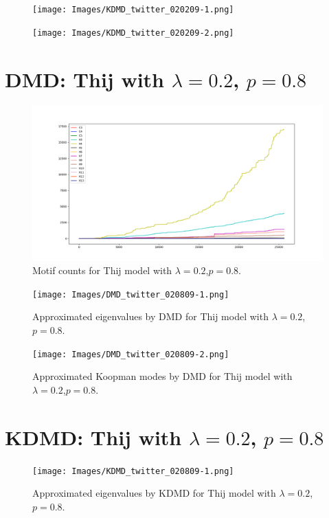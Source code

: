 \FloatBarrier


\begin{figure}
    \texttt{[image: Images/KDMD\_twitter\_020209-1.png]}
    \centering
\end{figure}

\begin{figure}
    \texttt{[image: Images/KDMD\_twitter\_020209-2.png]}
    \centering
\end{figure}

\FloatBarrier
\section{DMD: Thij with $\lambda=0.2$, $p=0.8$}
\begin{figure}
    \includegraphics[width=12cm]{Images/twitter_counts_020809.png}
    \centering
    \caption{Motif counts for Thij model with $\lambda=0.2$,$p=0.8$.}
\end{figure}

\begin{figure}
    \texttt{[image: Images/DMD\_twitter\_020809-1.png]}
    \centering
    \caption{Approximated eigenvalues by DMD for Thij model
    with $\lambda=0.2$,$p=0.8$.}
\end{figure}

\begin{figure}
    \texttt{[image: Images/DMD\_twitter\_020809-2.png]}
    \centering
    \caption{Approximated Koopman modes by DMD for Thij model
    with $\lambda=0.2$,$p=0.8$.}
\end{figure}


\section{KDMD: Thij with $\lambda=0.2$, $p=0.8$}


\begin{figure}
    \texttt{[image: Images/KDMD\_twitter\_020809-1.png]}
    \centering
    \caption{Approximated eigenvalues by KDMD for Thij model
    with $\lambda=0.2$,$p=0.8$.}
\end{figure}

